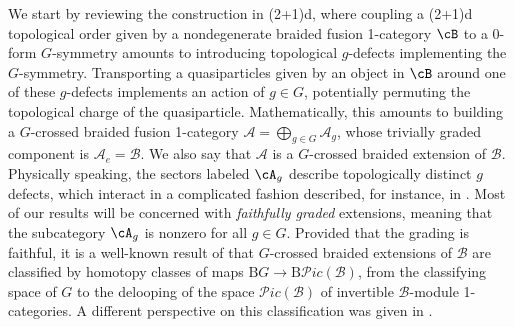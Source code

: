 \documentclass[11pt,reqno]{amsart}
\newcommand{\Pic}{\mathcal{P}ic}
\newcommand{\rB}{\mathrm{B}}
\numberwithin{equation}{section}
\theoremstyle{plain}
\theoremstyle{definition}
\begin{document}
We start by reviewing the construction in (2+1)d, where coupling a (2+1)d topological order given by a nondegenerate braided fusion 1-category $\cB$ to a 0-form $G$-symmetry amounts to introducing topological $g$-defects implementing the $G$-symmetry. Transporting a quasiparticles given by an object in $\cB$ around one of these $g$-defects implements an action of $g \in G$, potentially permuting the topological charge of the quasiparticle.
Mathematically, this amounts to building a $G$-crossed braided fusion 1-category $\mathcal{A} = \bigoplus_{g\in G} \mathcal{A}_g$, whose trivially graded component is $\mathcal{A}_e=\mathcal{B}$. We also say that $\mathcal{A}$ is a $G$-crossed braided extension of $\mathcal{B}$. Physically speaking, the sectors labeled $\cA_g$ describe topologically distinct $g$ defects, which interact in a complicated fashion described, for instance, in \cite[Definition 8.24.1]{etingof2016tensor}.
Most of our results will be concerned with \textit{faithfully graded} extensions, meaning that the subcategory $\cA_g$ is nonzero for all $g\in G$.
Provided that the grading is faithful, it is a well-known result of \cite{ENO2} that $G$-crossed braided extensions of $\mathcal{B}$ are classified by homotopy classes of maps $\rB G\rightarrow \rB \Pic(\mathcal{B})$, from the classifying space of $G$ to the delooping of the space $\Pic(\mathcal{B})$ of invertible $\mathcal{B}$-module 1-categories. A different perspective on this classification was given in \cite[Section 8.2]{davydov2021braided}.
\end{document}
